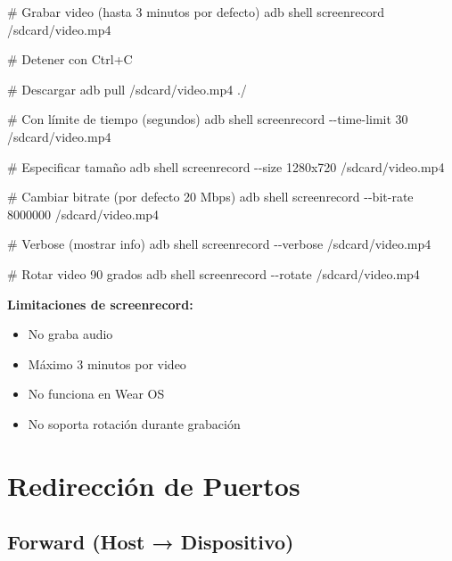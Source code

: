 \documentclass[
  doc,
  floatsintext,
  longtable,
  a4paper,
  nolmodern,
  notxfonts,
  notimes,
  12pt,
  colorlinks=true,linkcolor=blue,citecolor=blue,urlcolor=blue]{apa7}
\newenvironment{Shaded}{\begin{snugshade}}{\end{snugshade}}
\newcommand{\AttributeTok}[1]{\textcolor[rgb]{0.40,0.45,0.13}{#1}}
\newcommand{\CommentTok}[1]{\textcolor[rgb]{0.37,0.37,0.37}{#1}}
\newcommand{\ExtensionTok}[1]{\textcolor[rgb]{0.00,0.23,0.31}{#1}}
\newcommand{\NormalTok}[1]{\textcolor[rgb]{0.00,0.23,0.31}{#1}}
\providecommand{\tightlist}{%
  \setlength{\itemsep}{0pt}\setlength{\parskip}{0pt}}
\begin{document}
\begin{Shaded}
\begin{Highlighting}[]
\CommentTok{\# Grabar video (hasta 3 minutos por defecto)}
\ExtensionTok{adb}\NormalTok{ shell screenrecord /sdcard/video.mp4}

\CommentTok{\# Detener con Ctrl+C}

\CommentTok{\# Descargar}
\ExtensionTok{adb}\NormalTok{ pull /sdcard/video.mp4 ./}

\CommentTok{\# Con límite de tiempo (segundos)}
\ExtensionTok{adb}\NormalTok{ shell screenrecord }\AttributeTok{{-}{-}time{-}limit}\NormalTok{ 30 /sdcard/video.mp4}

\CommentTok{\# Especificar tamaño}
\ExtensionTok{adb}\NormalTok{ shell screenrecord }\AttributeTok{{-}{-}size}\NormalTok{ 1280x720 /sdcard/video.mp4}

\CommentTok{\# Cambiar bitrate (por defecto 20 Mbps)}
\ExtensionTok{adb}\NormalTok{ shell screenrecord }\AttributeTok{{-}{-}bit{-}rate}\NormalTok{ 8000000 /sdcard/video.mp4}

\CommentTok{\# Verbose (mostrar info)}
\ExtensionTok{adb}\NormalTok{ shell screenrecord }\AttributeTok{{-}{-}verbose}\NormalTok{ /sdcard/video.mp4}

\CommentTok{\# Rotar video 90 grados}
\ExtensionTok{adb}\NormalTok{ shell screenrecord }\AttributeTok{{-}{-}rotate}\NormalTok{ /sdcard/video.mp4}
\end{Highlighting}
\end{Shaded}

\textbf{Limitaciones de screenrecord:}

\begin{itemize}
\tightlist
\item
  No graba audio
\item
  Máximo 3 minutos por video
\item
  No funciona en Wear OS
\item
  No soporta rotación durante grabación
\end{itemize}

\section{Redirección de Puertos}\label{redirecciuxf3n-de-puertos}

\subsection{Forward (Host →
Dispositivo)}\label{forward-host-dispositivo}
\end{document}
